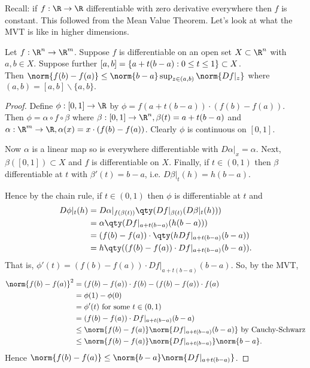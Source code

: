 Recall: if $f: \R\to\R$ differentiable with zero derivative everywhere then $f$ is constant.
This followed from the Mean Value Theorem.
Let's look at what the MVT is like in higher dimensions.

\begin{theorem} \label{thm:2.7}
    Let $f:\R^n\to\R^m$. Suppose $f$ is differentiable on an open set $X\subset \R^n$ with $a,b\in X$.
    Suppose further $[a,b] = \{a+t(b-a) : 0\leq t\leq 1\}\subset X$. \\
    Then $\norm{f(b) - f(a)} \leq \norm{b-a} \sup_{z\in(a,b)}\norm{Df|_z}$ where $(a,b) = [a,b] \backslash \{a,b\}.$
\end{theorem}

\begin{proof}
    Define $\phi: [0,1] \to \R$ by $\phi = f(a+t(b-a)) \cdot (f(b)-f(a))$.
    Then $\phi = \alpha \circ f\circ\beta$ where $\beta:[0,1]\to \R^n,\beta(t) = a+t(b-a)$ and $\alpha: \R^m\to \R, \alpha(x) = x\cdot(f(b) -f(a))$.
    Clearly $\phi$ is continuous on $[0,1]$.

    Now $\alpha$ is a linear map so is everywhere differentiable with $D\alpha|_x = \alpha$. Next, $\beta([0,1])\subset X$ and $f$ is differentiable on $X$. Finally, if $t\in (0,1)$ then $\beta$ differentiable at $t$ with $\beta'(t) = b-a$, i.e. $D\beta|_t(h) = h(b-a)$.

    Hence by the chain rule, if $t\in (0,1)$ then $\phi$ is differentiable at $t$ and \begin{align*}
        D\phi|_t(h) &= D\alpha|_{f(\beta(t))} \qty(Df|_{\beta(t)} (D\beta|_t(h))) \\
        &= \alpha \qty( Df|_{a+t(b-a)}(h(b-a)) )\\
        &= (f(b)-f(a)) \cdot \qty(h Df|_{a+t(b-a)}(b-a) )\\
        &= h \qty( (f(b)-f(a))\cdot Df|_{a+t(b-a)}(b-a) ).
    \end{align*}
    That is, $\phi'(t) = (f(b)-f(a))\cdot Df|_{a+t(b-a)}(b-a)$. So, by the MVT,
    \begin{align*}
        \norm{f(b) - f(a)}^2 &= (f(b)-f(a)) \cdot f(b) - (f(b)-f(a)) \cdot f(a)\\
        &= \phi(1) - \phi(0)\\
        &= \phi'(t) \textup{ for some } t\in(0,1)\\
        &= (f(b)-f(a))\cdot Df|_{a+t(b-a)}(b-a)\\
        &\leq \norm{f(b)-f(a)} \norm{Df|_{a+t(b-a)}(b-a)} \textup{ by Cauchy-Schwarz}\\
        &\leq \norm{f(b)-f(a)} \norm{Df|_{a+t(b-a)}} \norm{b-a}.
    \end{align*}
    Hence $\norm{f(b) - f(a)}\leq\norm{b-a} \norm{Df|_{a+t(b-a)}}$.
    \end{proof}

